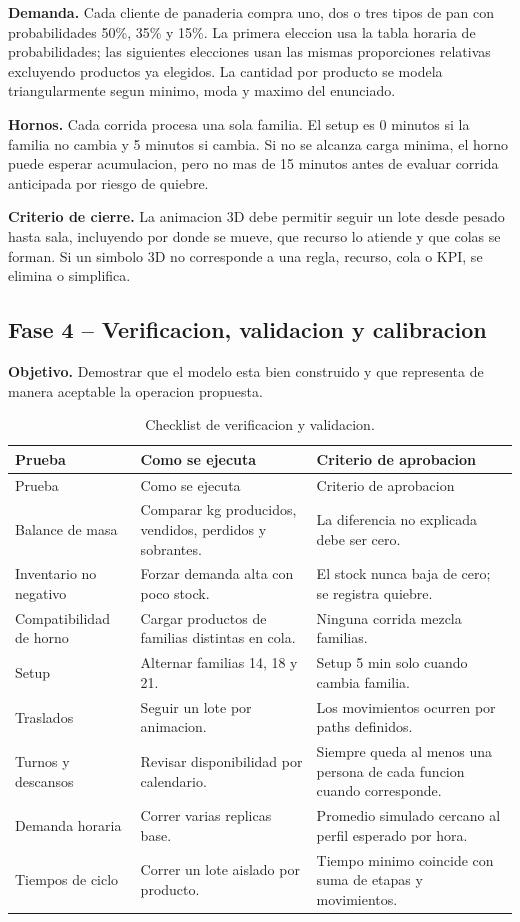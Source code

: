 \documentclass[12pt]{article}
\begin{document}
\textbf{Demanda.} Cada cliente de panaderia compra uno, dos o tres tipos de pan con probabilidades 50\%, 35\% y 15\%. La primera eleccion usa la tabla horaria de probabilidades; las siguientes elecciones usan las mismas proporciones relativas excluyendo productos ya elegidos. La cantidad por producto se modela triangularmente segun minimo, moda y maximo del enunciado.

\textbf{Hornos.} Cada corrida procesa una sola familia. El setup es 0 minutos si la familia no cambia y 5 minutos si cambia. Si no se alcanza carga minima, el horno puede esperar acumulacion, pero no mas de 15 minutos antes de evaluar corrida anticipada por riesgo de quiebre.

\textbf{Criterio de cierre.} La animacion 3D debe permitir seguir un lote desde pesado hasta sala, incluyendo por donde se mueve, que recurso lo atiende y que colas se forman. Si un simbolo 3D no corresponde a una regla, recurso, cola o KPI, se elimina o simplifica.

\subsection{Fase 4 -- Verificacion, validacion y calibracion}

\textbf{Objetivo.} Demostrar que el modelo esta bien construido y que representa de manera aceptable la operacion propuesta.

\begin{longtable}{L{3.3cm}L{5.2cm}L{6.0cm}}
\caption{Checklist de verificacion y validacion.}\\
\toprule
{}
\color{white}Prueba & \color{white}Como se ejecuta & \color{white}Criterio de aprobacion \\
\midrule
\endfirsthead
\toprule
{}
\color{white}Prueba & \color{white}Como se ejecuta & \color{white}Criterio de aprobacion \\
\midrule
\endhead
Balance de masa & Comparar kg producidos, vendidos, perdidos y sobrantes. & La diferencia no explicada debe ser cero. \\
Inventario no negativo & Forzar demanda alta con poco stock. & El stock nunca baja de cero; se registra quiebre. \\
Compatibilidad de horno & Cargar productos de familias distintas en cola. & Ninguna corrida mezcla familias. \\
Setup & Alternar familias 14, 18 y 21. & Setup 5 min solo cuando cambia familia. \\
Traslados & Seguir un lote por animacion. & Los movimientos ocurren por paths definidos. \\
Turnos y descansos & Revisar disponibilidad por calendario. & Siempre queda al menos una persona de cada funcion cuando corresponde. \\
Demanda horaria & Correr varias replicas base. & Promedio simulado cercano al perfil esperado por hora. \\
Tiempos de ciclo & Correr un lote aislado por producto. & Tiempo minimo coincide con suma de etapas y movimientos. \\
\bottomrule
\end{longtable}
\end{document}
